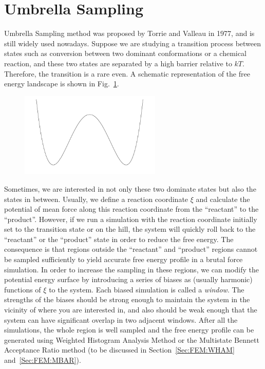 \section{Umbrella Sampling\label{Sec:ES:US}}
Umbrella Sampling method was proposed by Torrie and Valleau in 1977,\cite{TorrieJComputP1977} and is still widely used nowadays.
Suppose we are studying a transition process between states such as conversion between two dominant conformations or a chemical reaction, and these two states are separated by a high barrier relative to $kT$. Therefore, the transition is a rare even. A schematic representation of the free energy landscape is shown in Fig.~\ref{Fig:ES:dual_harmonic}.
\begin{figure}[htbp]
	\centering
	\includegraphics[width=0.6\textwidth]{figures/dual_harmonic.pdf}\\
	\caption{}\label{Fig:ES:dual_harmonic}
\end{figure}

Sometimes, we are interested in not only these two dominate states but also the states in between. Usually, we define a reaction coordinate $\xi$ and calculate the potential of mean force along this reaction coordinate from the ``reactant'' to the ``product''. However, if we run a simulation with the reaction coordinate initially set to the transition state or on the hill, the system will quickly roll back to the ``reactant'' or the ``product'' state in order to reduce the free energy. The consequence is that regions outside the ``reactant'' and ``product'' regions cannot be sampled sufficiently to yield accurate free energy profile in a brutal force simulation. In order to increase the sampling in these regions, we can modify the potential energy surface by introducing a series of biases as (usually harmonic) functions of $\xi$ to the system. Each biased simulation is called a \textit{window}. The strengths of the biases should be strong enough to maintain the system in the vicinity of where you are interested in, and also should be weak enough that the system can have significant overlap in two adjacent windows. After all the simulations, the whole region is well sampled and the free energy profile can be generated using Weighted Histogram Analysis Method or the Multistate Bennett Acceptance Ratio method (to be discussed in Section~\ref{Sec:FEM:WHAM} and~\ref{Sec:FEM:MBAR}).